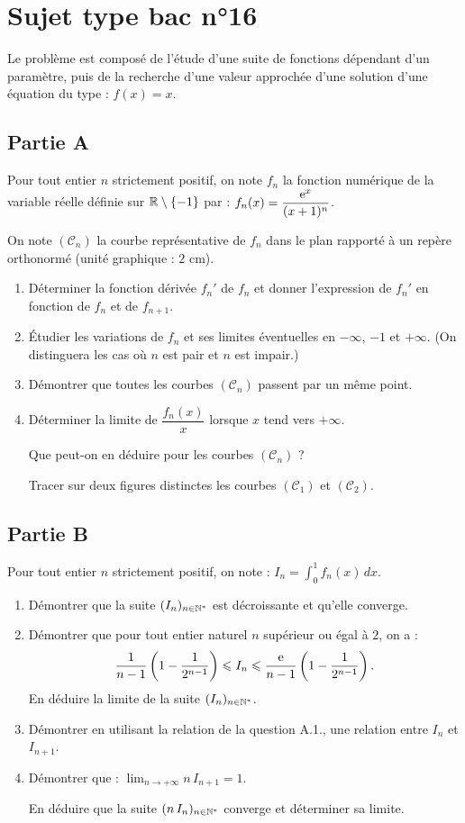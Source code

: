 \section*{Sujet type bac n°16}

Le problème est composé de l'étude d'une suite de fonctions dépendant d'un paramètre, puis de la recherche d'une valeur approchée d'une solution d'une équation du type : $f(x)=x$.

\subsection*{Partie A}

Pour tout entier $n$ strictement positif, on note $f_n$ la fonction numérique de la variable réelle définie sur $\mathbb{R}\setminus\{-1\}$ par : $f_n(x)=\dfrac{\mathrm{e}^x}{(x+1)^n}$.

On note $(\mathscr{C}_n)$ la courbe représentative de $f_n$ dans le plan rapporté à un repère orthonormé (unité graphique : $2$ cm).

\begin{enumerate}
	\item Déterminer la fonction dérivée $f_n'$ de $f_n$ et donner l'expression de $f_n'$ en fonction de $f_n$ et de $f_{n+1}$.
	\item Étudier les variations de $f_n$ et ses limites éventuelles en $-\infty$, $-1$ et $+\infty$. (On distinguera les cas où $n$ est pair et $n$ est impair.)
	\item Démontrer que toutes les courbes $(\mathscr{C}_n)$ passent par un même point.
	\item Déterminer la limite de $\dfrac{f_n(x)}{x}$ lorsque $x$ tend vers $+\infty$.

	Que peut-on en déduire pour les courbes $(\mathscr{C}_n)$ ?

	Tracer sur deux figures distinctes les courbes $(\mathscr{C}_1)$ et $(\mathscr{C}_2)$.
\end{enumerate}

\subsection*{Partie B}

Pour tout entier $n$ strictement positif, on note : $\displaystyle I_n=\int_0^1 f_n(x)\,dx$.

\begin{enumerate}
	\item Démontrer que la suite $(I_n)_{n\in\mathbb{N}^*}$ est décroissante et qu'elle converge.
	\item Démontrer que pour tout entier naturel $n$ supérieur ou égal à $2$, on a :
	\[
	\frac{1}{n-1}\left(1-\frac{1}{2^{n-1}}\right) \leqslant I_n \leqslant \frac{\mathrm{e}}{n-1}\left(1-\frac{1}{2^{n-1}}\right).
	\]
	En déduire la limite de la suite $(I_n)_{n\in\mathbb{N}^*}$.
	\item Démontrer en utilisant la relation de la question A.1., une relation entre $I_n$ et $I_{n+1}$.
	\item Démontrer que : $\displaystyle\lim_{n\to+\infty} n\,I_{n+1} = 1$.

	En déduire que la suite $(n\,I_n)_{n\in\mathbb{N}^*}$ converge et déterminer sa limite.
\end{enumerate}

